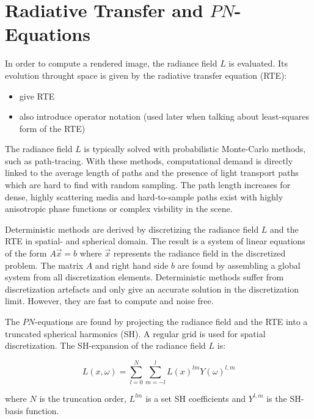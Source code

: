 \section{Radiative Transfer and $PN$-Equations}

In order to compute a rendered image, the radiance field $L$ is evaluated. Its evolution throught space is given by the radiative transfer equation (RTE):

\begin{itemize}
  \item give RTE
  \item also introduce operator notation (used later when talking about least-squares form of the RTE)
\end{itemize}


The radiance field $L$ is typically solved with probabilistic Monte-Carlo methods, such as path-tracing. With these methods, computational demand is directly linked to the average length of paths and the presence of light transport paths which are hard to find with random sampling. The path length increases for dense, highly scattering media and hard-to-sample paths exist with highly anisotropic phase functions or complex visbility in the scene.

Deterministic methods are derived by discretizing the radiance field $L$ and the RTE in spatial- and spherical domain. The result is a system of linear equations of the form $A\vec{x}=b$ where $\vec{x}$ represents the radiance field in the discretized problem. The matrix $A$ and right hand side $b$ are found by assembling a global system from all discretization elements. Deterministic methods suffer from discretization artefacts and only give an accurate solution in the discretization limit. However, they are fast to compute and noise free.

The $PN$-equations are found by projecting the radiance field and the RTE into a truncated spherical harmonics (SH). A regular grid is used for spatial discretization. The SH-expansion of the radiance field $L$ is:

\begin{equation}
L\left(x, \omega \right) = \sum_{l=0}^{N}
\sum_{m=-l}^{l}
L\left(x\right)^{lm}
Y\left(\omega\right)^{l,m}
\end{equation}

where $N$ is the truncation order, $L^{lm}$ is a set SH coefficients and $Y^{l,m}$ is the SH-basis function.



